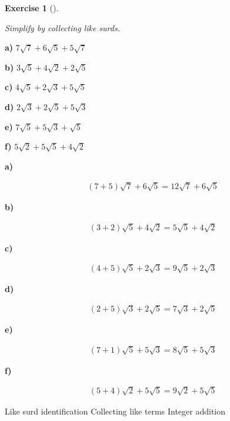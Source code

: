 \documentclass[
  letterpaper,
  DIV=11,
  numbers=noendperiod]{scrreprt}
\theoremstyle{definition}
\newtheorem{exercise}{Exercise}[chapter]
\theoremstyle{remark}
\begin{document}
\begin{exercise}[]\protect\hypertarget{exr-u2-33}{}\label{exr-u2-33}

\emph{Simplify by collecting like surds.}

\textbf{a)} \(\displaystyle 7\sqrt{7}+6\sqrt{5}+5\sqrt{7}\)

\textbf{b)} \(\displaystyle 3\sqrt{5}+4\sqrt{2}+2\sqrt{5}\)

\textbf{c)} \(\displaystyle 4\sqrt{5}+2\sqrt{3}+5\sqrt{5}\)

\textbf{d)} \(\displaystyle 2\sqrt{3}+2\sqrt{5}+5\sqrt{3}\)

\textbf{e)} \(\displaystyle 7\sqrt{5}+5\sqrt{3}+\sqrt{5}\)

\textbf{f)} \(\displaystyle 5\sqrt{2}+5\sqrt{5}+4\sqrt{2}\)

\begin{tcolorbox}[enhanced jigsaw, opacitybacktitle=0.6, coltitle=black, arc=.35mm, colframe=quarto-callout-tip-color-frame, colback=white, bottomrule=.15mm, left=2mm, colbacktitle=quarto-callout-tip-color!10!white, titlerule=0mm, opacityback=0, title=\textcolor{quarto-callout-tip-color}{\faLightbulb}\hspace{0.5em}{🔍 View Solutions}, leftrule=.75mm, breakable, rightrule=.15mm, bottomtitle=1mm, toptitle=1mm, toprule=.15mm]

\textbf{a)}

\[
\begin{aligned}
(7+5)\sqrt{7}+6\sqrt{5}=12\sqrt{7}+6\sqrt{5}
\end{aligned}
\]

\textbf{b)}

\[
\begin{aligned}
(3+2)\sqrt{5}+4\sqrt{2}=5\sqrt{5}+4\sqrt{2}
\end{aligned}
\]

\textbf{c)}

\[
\begin{aligned}
(4+5)\sqrt{5}+2\sqrt{3}=9\sqrt{5}+2\sqrt{3}
\end{aligned}
\]

\textbf{d)}

\[
\begin{aligned}
(2+5)\sqrt{3}+2\sqrt{5}=7\sqrt{3}+2\sqrt{5}
\end{aligned}
\]

\textbf{e)}

\[
\begin{aligned}
(7+1)\sqrt{5}+5\sqrt{3}=8\sqrt{5}+5\sqrt{3}
\end{aligned}
\]

\textbf{f)}

\[
\begin{aligned}
(5+4)\sqrt{2}+5\sqrt{5}=9\sqrt{2}+5\sqrt{5}
\end{aligned}
\]

\end{tcolorbox}

{Like surd identification} {Collecting like terms} {Integer addition}

\end{exercise}
\end{document}
